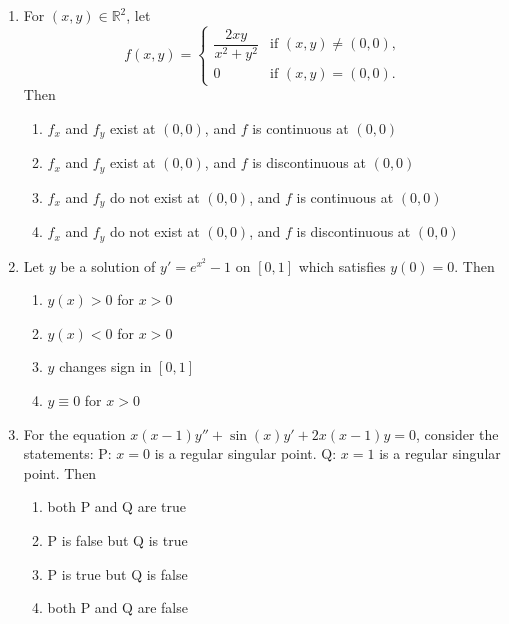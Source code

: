 \documentclass[journal,12pt,onecolumn]{IEEEtran}
\theoremstyle{remark}
\begin{document}
\begin{enumerate}
\item For $(x,y) \in \mathbb{R}^2$, let  
\[
f(x,y) = 
\begin{cases}
\dfrac{2xy}{x^2 + y^2} & \text{if } (x,y) \neq (0,0),\\[4pt]
0 & \text{if } (x,y) = (0,0).
\end{cases}
\]
Then
\\[-0.3em]\makebox[\textwidth][r]{\textit{[GATE EE 2025]}}

\begin{multicols}{2}
\begin{enumerate}[label=(\Alph*)]
\item $f_x$ and $f_y$ exist at $(0,0)$, and $f$ is continuous at $(0,0)$
\item $f_x$ and $f_y$ exist at $(0,0)$, and $f$ is discontinuous at $(0,0)$
\item $f_x$ and $f_y$ do not exist at $(0,0)$, and $f$ is continuous at $(0,0)$
\item $f_x$ and $f_y$ do not exist at $(0,0)$, and $f$ is discontinuous at $(0,0)$
\end{enumerate}
\end{multicols}

\item Let $y$ be a solution of $y' = e^{x^2} - 1$ on $[0,1]$ which satisfies $y(0) = 0$. Then 
\\[-0.3em]\makebox[\textwidth][r]{\textit{[GATE EE 2025]}}

\begin{multicols}{2}
\begin{enumerate}[label=(\Alph*)]
\item $y(x) > 0$ for $x > 0$
\item $y(x) < 0$ for $x > 0$
\item $y$ changes sign in $[0,1]$
\item $y \equiv 0$ for $x > 0$
\end{enumerate}
\end{multicols}

\item For the equation $x(x-1)y'' + \sin(x)y' + 2x(x-1)y = 0$, consider the statements:  
P: $x=0$ is a regular singular point.  
Q: $x=1$ is a regular singular point.  
Then 
\\[-0.3em]\makebox[\textwidth][r]{\textit{[GATE EE 2025]}}

\begin{multicols}{2}
\begin{enumerate}[label=(\Alph*)]
\item both P and Q are true
\item P is false but Q is true
\item P is true but Q is false
\item both P and Q are false
\end{enumerate}
\end{multicols}


\end{enumerate}
\end{document}
